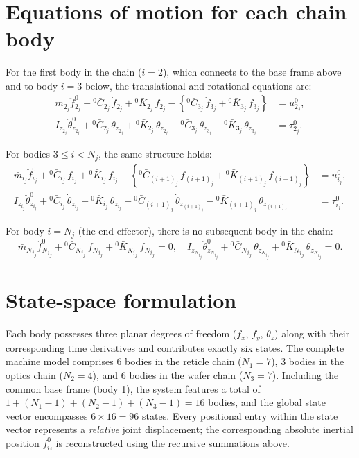 \documentclass[11pt,letterpaper]{article}
\begin{document}
\section*{Equations of motion for each chain body}

For the first body in the chain ($i=2$), which connects to the base frame above and to body $i=3$ below, the translational and rotational equations are:
\begin{align}
    \bar{m}_{2_j}\ddot{f}^{0}_{2_j}
    + {}^0\bar{C}_{2_j}\,\dot{f}_{2_j}
    + {}^0\bar{K}_{2_j}\,f_{2_j}
    - \left\{ {}^0\bar{C}_{3_j}\,\dot{f}_{3_j} + {}^0\bar{K}_{3_j}\,f_{3_j} \right\} &= u^0_{2_j}, \\
    I_{z_{2_j}}\ddot{\theta}^{0}_{z_{2_j}}
    + {}^0\bar{C}_{2_j}\,\dot{\theta}_{z_{2_j}}
    + {}^0\bar{K}_{2_j}\,\theta_{z_{2_j}}
    - {}^0\bar{C}_{3_j}\,\dot{\theta}_{z_{3_j}}
    - {}^0\bar{K}_{3_j}\,\theta_{z_{3_j}} &= \tau^0_{2_j}.
\end{align}

For bodies $3\leq i< N_j$, the same structure holds:
\begin{align}
    \bar{m}_{i_j}\ddot{f}^{0}_{i_j}
    + {}^0\bar{C}_{i_j}\,\dot{f}_{i_j}
    + {}^0\bar{K}_{i_j}\,f_{i_j}
    - \left\{ {}^0\bar{C}_{(i+1)_j}\,\dot{f}_{(i+1)_j} + {}^0\bar{K}_{(i+1)_j}\,f_{(i+1)_j} \right\} &= u^0_{i_j}, \\
    I_{z_{i_j}}\ddot{\theta}^{0}_{z_{i_j}}
    + {}^0\bar{C}_{i_j}\,\dot{\theta}_{z_{i_j}}
    + {}^0\bar{K}_{i_j}\,\theta_{z_{i_j}}
    - {}^0\bar{C}_{(i+1)_j}\,\dot{\theta}_{z_{(i+1)_j}}
    - {}^0\bar{K}_{(i+1)_j}\,\theta_{z_{(i+1)_j}} &= \tau^0_{i_j}.
\end{align}

For body $i = N_j$ (the end effector), there is no subsequent body in the chain:
\begin{equation}
    \bar{m}_{{N_j}_j}\ddot{f}^{0}_{{N_j}_j}
    + {}^0\bar{C}_{{N_j}_j}\,\dot{f}_{{N_j}_j}
    + {}^0\bar{K}_{{N_j}_j}\,f_{{N_j}_j} = 0,
    \quad
    I_{z_{{N_j}_j}}\ddot{\theta}^{0}_{z_{{N_j}_j}}
    + {}^0\bar{C}_{{N_j}_j}\,\dot{\theta}_{z_{{N_j}_j}}
    + {}^0\bar{K}_{{N_j}_j}\,\theta_{z_{{N_j}_j}} = 0.
\end{equation}

\section*{State-space formulation}

Each body possesses three planar degrees of freedom ($f_x$, $f_y$, $\theta_z$) along with their corresponding time derivatives and contributes exactly six states. The complete machine model comprises 6 bodies in the reticle chain ($N_1 = 7$), 3 bodies in the optics chain ($N_2 = 4$), and 6 bodies in the wafer chain ($N_3 = 7$). Including the common base frame (body 1), the system features a total of $1 + (N_1-1) + (N_2-1) + (N_3-1) = 16$ bodies, and the global state vector encompasses $6 \times 16 = 96$ states. Every positional entry within the state vector represents a \emph{relative} joint displacement; the corresponding absolute inertial position $f^0_{i_j}$ is reconstructed using the recursive summations above.
\end{document}
